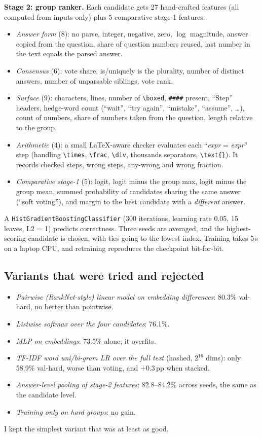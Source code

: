 \documentclass[10pt,a4paper]{article}
\begin{document}
\textbf{Stage 2: group ranker.} Each candidate gets 27 hand-crafted features (all computed from inputs only) plus 5 comparative stage-1 features:
\begin{itemize}
\item \emph{Answer form} (8): no parse, integer, negative, zero, $\log$ magnitude, answer copied from the question, share of question numbers reused, last number in the text equals the parsed answer.
\item \emph{Consensus} (6): vote share, is/uniquely is the plurality, number of distinct answers, number of unparsable siblings, vote rank.
\item \emph{Surface} (9): characters, lines, number of \verb|\boxed|, \texttt{\#\#\#\#} present, ``Step'' headers, hedge-word count (``wait'', ``try again'', ``mistake'', ``assume'', \dots), count of numbers, share of numbers taken from the question, length relative to the group.
\item \emph{Arithmetic} (4): a small LaTeX-aware checker evaluates each ``\textit{expr} = \textit{expr}'' step (handling \verb|\times|, \verb|\frac|, \verb|\div|, thousands separators, \verb|\text{}|). It records checked steps, wrong steps, any-wrong and wrong fraction.
\item \emph{Comparative stage-1} (5): logit, logit minus the group max, logit minus the group mean, summed probability of candidates sharing the same answer (``soft voting''), and margin to the best candidate with a \emph{different} answer.
\end{itemize}
A \texttt{HistGradientBoostingClassifier} (300 iterations, learning rate 0.05, 15 leaves, L2 = 1) predicts correctness. Three seeds are averaged, and the highest-scoring candidate is chosen, with ties going to the lowest index. Training takes 5\,s on a laptop CPU, and retraining reproduces the checkpoint bit-for-bit.

\subsection{Variants that were tried and rejected}
\begin{itemize}
\item \emph{Pairwise (RankNet-style) linear model on embedding differences}: 80.3\% val-hard, no better than pointwise.
\item \emph{Listwise softmax over the four candidates}: 76.1\%.
\item \emph{MLP on embeddings}: 73.5\% alone; it overfits.
\item \emph{TF-IDF word uni/bi-gram LR over the full text} (hashed, $2^{16}$ dims): only 58.9\% val-hard, worse than voting, and $+0.3$\,pp when stacked.
\item \emph{Answer-level pooling of stage-2 features}: 82.8--84.2\% across seeds, the same as the candidate level.
\item \emph{Training only on hard groups}: no gain.
\end{itemize}
I kept the simplest variant that was at least as good.
\end{document}
